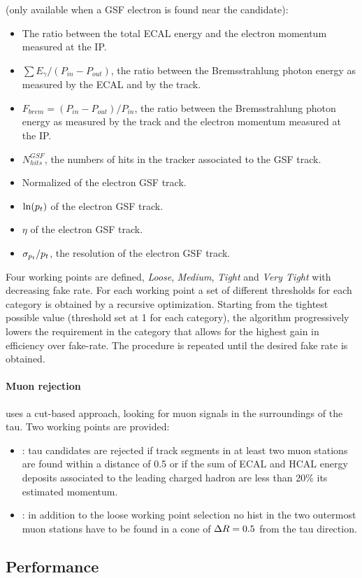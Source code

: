  (only available when a GSF electron is found near the candidate):
\begin{itemize}
\item The ratio between the total ECAL energy and the electron momentum measured at the IP.
\item $\sum E_{\gamma}/(P_{in}-P_{out})$, the ratio between the Bremsstrahlung photon energy as measured by the ECAL and by the track.
\item $F_{brem}=(P_{in}-P_{out})/P_{in}$, the ratio between the Bremsstrahlung photon energy as measured by the track and the electron momentum measured at the IP.
\item $N_{hits}^{GSF}$, the numbers of hits in the tracker associated to the GSF track.
\item Normalized \chisq of the electron GSF track.
\item $\ln (p_{t})$ of the electron GSF track.
\item $\eta$ of the electron GSF track.
\item $\sigma_{p_{t}}/p_{t}$, the \pT resolution of the electron GSF track.
\end{itemize}

Four working points are defined, \emph{Loose}, \emph{Medium}, \emph{Tight} and \emph{Very Tight} with decreasing fake rate. For each working point a set of different thresholds for each category is obtained by a recursive optimization. Starting from the tightest possible value (threshold set at 1 for each category), the algorithm progressively lowers the requirement in the category that allows for the highest gain in efficiency over fake-rate. The procedure is repeated until the desired fake rate is obtained.

\paragraph{Muon rejection} uses a cut-based approach, looking for muon signals in the surroundings of the tau. Two working points are provided:

\begin{itemize}
\item {}: tau candidates are rejected if track segments in at least two muon stations are found within a \DR distance of 0.5 or if the sum of ECAL and HCAL energy deposits associated to the leading charged hadron are less than 20\% its estimated momentum.
\item {}: in addition to the loose working point selection no hist in the two outermost muon stations have to be found in a cone of $\Delta R = 0.5$ from the tau direction.
\end{itemize}

\subsection{Performance}

